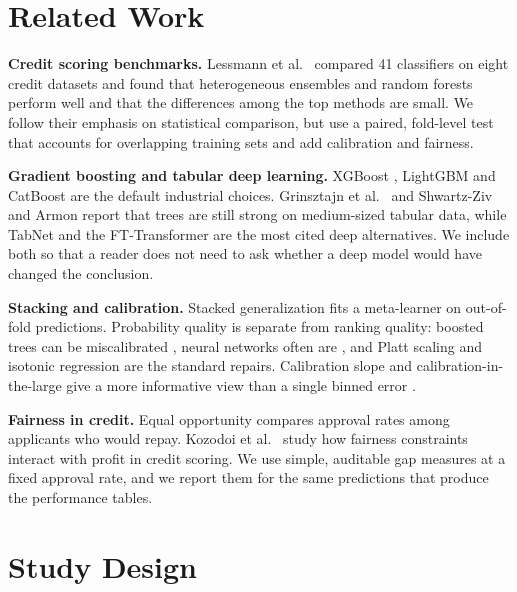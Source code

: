 \documentclass[conference,a4paper]{IEEEtran}
\begin{document}
\section{Related Work}
\textbf{Credit scoring benchmarks.} Lessmann et al.\ \cite{lessmann} compared 41 classifiers on eight credit datasets and found that heterogeneous ensembles and random forests perform well and that the differences among the top methods are small. We follow their emphasis on statistical comparison, but use a paired, fold-level test that accounts for overlapping training sets \cite{r25,demsar} and add calibration and fairness.

\textbf{Gradient boosting and tabular deep learning.} XGBoost \cite{r2}, LightGBM \cite{r23} and CatBoost \cite{r24} are the default industrial choices. Grinsztajn et al.\ \cite{r30} and Shwartz-Ziv and Armon \cite{szarmon} report that trees are still strong on medium-sized tabular data, while TabNet \cite{tabnet} and the FT-Transformer \cite{ftt} are the most cited deep alternatives. We include both so that a reader does not need to ask whether a deep model would have changed the conclusion.

\textbf{Stacking and calibration.} Stacked generalization \cite{r5} fits a meta-learner on out-of-fold predictions. Probability quality is separate from ranking quality: boosted trees can be miscalibrated \cite{r32}, neural networks often are \cite{r28}, and Platt scaling \cite{r26} and isotonic regression \cite{r27} are the standard repairs. Calibration slope and calibration-in-the-large give a more informative view than a single binned error \cite{vancalster,r29}.

\textbf{Fairness in credit.} Equal opportunity \cite{hardt} compares approval rates among applicants who would repay. Kozodoi et al.\ \cite{kozodoi} study how fairness constraints interact with profit in credit scoring. We use simple, auditable gap measures at a fixed approval rate, and we report them for the same predictions that produce the performance tables.

\section{Study Design}
\end{document}
